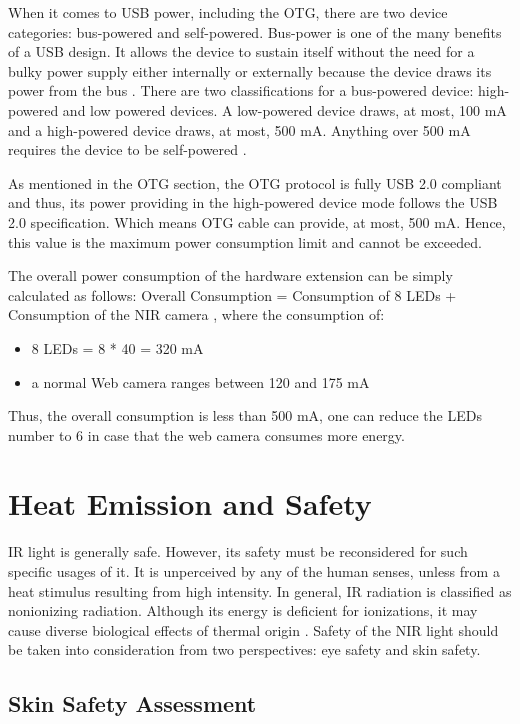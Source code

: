 When it comes to USB power, including the OTG, there are two device categories: bus-powered and self-powered. Bus-power is one of the many benefits of a USB design. It allows the device to sustain itself without the need for a bulky power supply either internally or externally because the device draws its power from the bus \parencite{usb}.
There are two classifications for a bus-powered device: high-powered and low powered devices. A low-powered device draws, at most, 100 mA and a high-powered device draws, at most, 500 mA. Anything over 500 mA requires the device to be self-powered \parencite{usb}.

As mentioned in the OTG section, the OTG protocol is fully USB 2.0 compliant and thus, its power providing in the high-powered device mode follows the USB 2.0 specification. Which means OTG cable can provide, at most, 500 mA. Hence, this value is the maximum power consumption limit and cannot be exceeded.

The overall power consumption of the hardware extension can be simply calculated as follows:	Overall Consumption = Consumption of 8 LEDs + Consumption of the NIR camera	, where the consumption of:
\begin{itemize}
	  \item 8 LEDs = 8 * 40 = 320 mA
	  \item a normal Web camera ranges between 120 and 175 mA
\end{itemize}
Thus, the overall consumption is less than 500 mA, one can reduce the LEDs number to 6 in case that the web camera consumes more energy.


\section{Heat Emission and Safety}
IR light is generally safe. However, its safety must be reconsidered for such specific usages of it. It is unperceived by any of the human senses, unless from a heat stimulus resulting from high intensity.
In general, IR radiation is classified as nonionizing radiation. Although its energy is deficient for ionizations, it may cause diverse biological effects of thermal origin \parencite{ledEyeSafety}.
Safety of the NIR light should be taken into consideration from two perspectives: eye safety and skin safety.

\subsection {Skin Safety Assessment}

